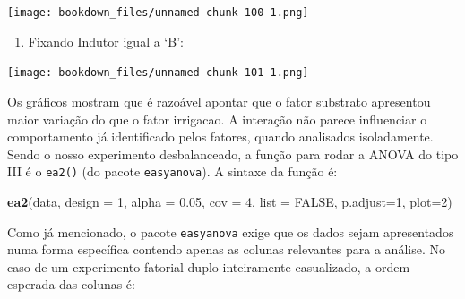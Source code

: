 \documentclass[
]{article}
\newenvironment{Shaded}{\begin{snugshade}}{\end{snugshade}}
\newcommand{\DataTypeTok}[1]{\textcolor[rgb]{0.13,0.29,0.53}{#1}}
\newcommand{\DecValTok}[1]{\textcolor[rgb]{0.00,0.00,0.81}{#1}}
\newcommand{\FloatTok}[1]{\textcolor[rgb]{0.00,0.00,0.81}{#1}}
\newcommand{\KeywordTok}[1]{\textcolor[rgb]{0.13,0.29,0.53}{\textbf{#1}}}
\newcommand{\NormalTok}[1]{#1}
\newcommand{\OperatorTok}[1]{\textcolor[rgb]{0.81,0.36,0.00}{\textbf{#1}}}
\newcommand{\OtherTok}[1]{\textcolor[rgb]{0.56,0.35,0.01}{#1}}
\newcommand{\StringTok}[1]{\textcolor[rgb]{0.31,0.60,0.02}{#1}}
\providecommand{\tightlist}{%
  \setlength{\itemsep}{0pt}\setlength{\parskip}{0pt}}
\begin{document}
\begin{Shaded}
\end{Shaded}

\texttt{[image: bookdown\_files/unnamed-chunk-100-1.png]}

\begin{enumerate}
\def\labelenumi{\arabic{enumi}.}
\setcounter{enumi}{6}
\tightlist
\item
  Fixando Indutor igual a `B':
\end{enumerate}

\begin{Shaded}
\end{Shaded}

\texttt{[image: bookdown\_files/unnamed-chunk-101-1.png]}

Os gráficos mostram que é razoável apontar que o fator substrato apresentou maior variação do que o fator irrigacao. A interação não parece influenciar o comportamento já identificado pelos fatores, quando analisados isoladamente. Sendo o nosso experimento desbalanceado, a função para rodar a ANOVA do tipo III é o \texttt{ea2()} (do pacote \texttt{easyanova}). A sintaxe da função é:

\begin{Shaded}
\begin{Highlighting}[]
\KeywordTok{ea2}\NormalTok{(data, }\DataTypeTok{design =} \DecValTok{1}\NormalTok{, }\DataTypeTok{alpha =} \FloatTok{0.05}\NormalTok{, }\DataTypeTok{cov =} \DecValTok{4}\NormalTok{, }\DataTypeTok{list =} \OtherTok{FALSE}\NormalTok{, }\DataTypeTok{p.adjust=}\DecValTok{1}\NormalTok{, }\DataTypeTok{plot=}\DecValTok{2}\NormalTok{)}
\end{Highlighting}
\end{Shaded}

Como já mencionado, o pacote \texttt{easyanova} exige que os dados sejam apresentados numa forma específica contendo apenas as colunas relevantes para a análise. No caso de um experimento fatorial duplo inteiramente casualizado, a ordem esperada das colunas é:
\end{document}
